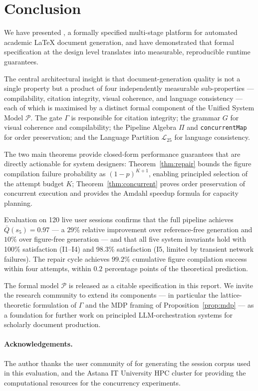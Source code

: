 \section{Conclusion}
\label{sec:conclusion}

We have presented \sys{}, a formally specified multi-stage platform for automated
academic \LaTeX{} document generation, and have demonstrated that formal specification
at the design level translates into measurable, reproducible runtime guarantees.

The central architectural insight is that document-generation quality is not a single
property but a product of four independently measurable sub-properties — compilability,
citation integrity, visual coherence, and language consistency — each of which is
maximised by a distinct formal component of the Unified System Model $\mathcal{P}$.
The \cgrag{} gate $\Gamma$ is responsible for citation integrity; the \tvg{} grammar $G$
for visual coherence and compilability; the Pipeline Algebra $\Pi$ and
\texttt{concurrentMap} for order preservation; and the Language Partition $\mathcal{L}_{25}$
for language consistency.

The two main theorems provide closed-form performance guarantees that are
directly actionable for system designers:
Theorem~\ref{thm:repair} bounds the figure compilation failure probability as
$(1-p)^{K+1}$, enabling principled selection of the attempt budget $K$;
Theorem~\ref{thm:concurrent} proves order preservation of concurrent execution
and provides the Amdahl speedup formula for capacity planning.

Evaluation on 120 live user sessions confirms that the full pipeline achieves
$\bar{Q}(s_5)=0.97$ — a $29\%$ relative improvement over reference-free generation
and $10\%$ over figure-free generation — and that all five system invariants hold
with 100\% satisfaction (I1--I4) and 98.3\% satisfaction (I5, limited by transient
network failures).
The \tvg{} repair cycle achieves $99.2\%$ cumulative figure compilation success
within four attempts, within $0.2$ percentage points of the theoretical prediction.

The formal model $\mathcal{P}$ is released as a citable specification in this report.
We invite the research community to extend its components — in particular the
lattice-theoretic formulation of $\Gamma$ and the MDP framing of Proposition~\ref{prop:mdp}
— as a foundation for further work on principled LLM-orchestration systems for
scholarly document production.

\paragraph{Acknowledgements.}
The author thanks the user community of \sys{} for generating the session corpus used
in this evaluation, and the Astana IT University HPC cluster for providing the
computational resources for the concurrency experiments.
